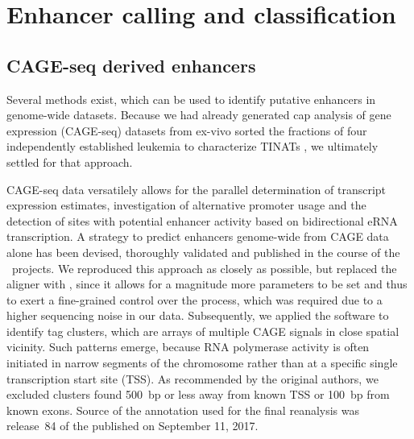 \chapter{Enhancer calling and classification}
\label{chap:r:enhancers:calling}

\section{CAGE-seq derived enhancers}
\label{chap:r:enhancers:cage}

Several methods exist, which can be used to identify putative enhancers in genome-wide datasets. Because we had already generated cap analysis of gene expression (CAGE-seq) \cite{Carninci1996,Shiraki2003,Takahashi2012} datasets from ex-vivo sorted the \kitpos fractions of four independently established leukemia to characterize TINATs , we ultimately settled for that approach. 

CAGE-seq data versatilely allows for the parallel determination of transcript expression estimates, investigation of alternative promoter usage and the detection of sites with potential enhancer activity based on bidirectional eRNA transcription. A strategy to predict enhancers genome-wide from CAGE data alone has been devised, thoroughly validated and published in the course of the ~projects\cite{Andersson2014}. We reproduced this approach as closely as possible, but replaced the aligner with \cite{Bushnell2014}, since it allows for a magnitude more parameters to be set and thus to exert a fine-grained control over the process, which was required due to a higher sequencing noise in our data. Subsequently, we applied the software \cite{Frith2008} to identify tag clusters, which are arrays of multiple CAGE signals in close spatial vicinity. Such patterns emerge, because RNA polymerase activity is often initiated in narrow segments of the chromosome rather than at a specific single transcription start site (TSS). As recommended by the original authors, we excluded clusters found \SI{500}{bp} or less away from known TSS or \SI{100}{bp} from known exons. Source of the annotation used for the final reanalysis was release~\num{84} of the  published on September 11, 2017. 

